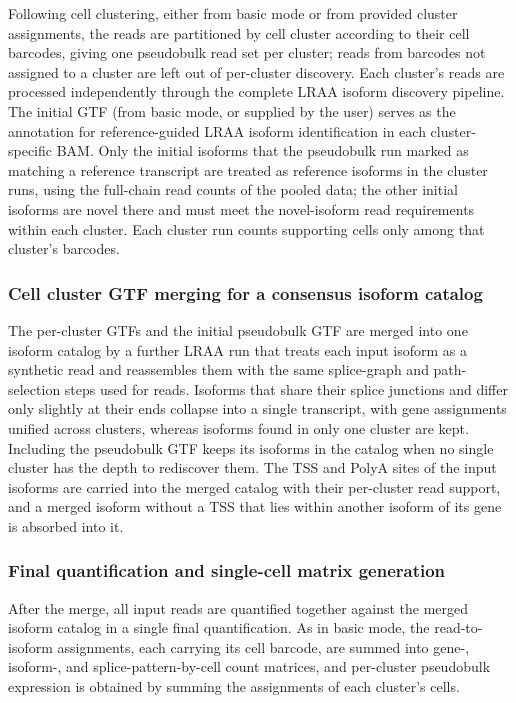 Following cell clustering, either from basic mode or from provided cluster assignments, the reads are partitioned by cell cluster according to their cell barcodes, giving one pseudobulk read set per cluster; reads from barcodes not assigned to a cluster are left out of per-cluster discovery. Each cluster's reads are processed independently through the complete LRAA isoform discovery pipeline. The initial GTF (from basic mode, or supplied by the user) serves as the annotation for reference-guided LRAA isoform identification in each cluster-specific BAM. Only the initial isoforms that the pseudobulk run marked as matching a reference transcript are treated as reference isoforms in the cluster runs, using the full-chain read counts of the pooled data; the other initial isoforms are novel there and must meet the novel-isoform read requirements within each cluster. Each cluster run counts supporting cells only among that cluster's barcodes.

\subsubsection{Cell cluster GTF merging for a consensus isoform catalog}\label{cell-cluster-gtf-merging-for-a-consensus-isoform-catalog}

The per-cluster GTFs and the initial pseudobulk GTF are merged into one isoform catalog by a further LRAA run that treats each input isoform as a synthetic read and reassembles them with the same splice-graph and path-selection steps used for reads. Isoforms that share their splice junctions and differ only slightly at their ends collapse into a single transcript, with gene assignments unified across clusters, whereas isoforms found in only one cluster are kept. Including the pseudobulk GTF keeps its isoforms in the catalog when no single cluster has the depth to rediscover them. The TSS and PolyA sites of the input isoforms are carried into the merged catalog with their per-cluster read support, and a merged isoform without a TSS that lies within another isoform of its gene is absorbed into it.

\subsubsection{Final quantification and single-cell matrix generation}\label{final-quantification-and-single-cell-matrix-generation}

After the merge, all input reads are quantified together against the merged isoform catalog in a single final quantification. As in basic mode, the read-to-isoform assignments, each carrying its cell barcode, are summed into gene-, isoform-, and splice-pattern-by-cell count matrices, and per-cluster pseudobulk expression is obtained by summing the assignments of each cluster's cells.

